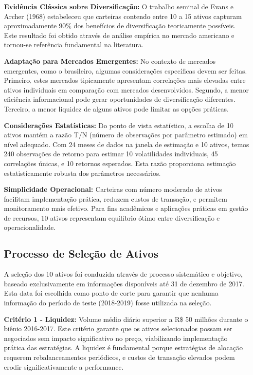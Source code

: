 \textbf{Evidência Clássica sobre Diversificação:} O trabalho seminal de Evans e Archer (1968) estabeleceu que carteiras contendo entre 10 a 15 ativos capturam aproximadamente 90\% dos benefícios de diversificação teoricamente possíveis. Este resultado foi obtido através de análise empírica no mercado americano e tornou-se referência fundamental na literatura.

\textbf{Adaptação para Mercados Emergentes:} No contexto de mercados emergentes, como o brasileiro, algumas considerações específicas devem ser feitas. Primeiro, estes mercados tipicamente apresentam correlações mais elevadas entre ativos individuais em comparação com mercados desenvolvidos. Segundo, a menor eficiência informacional pode gerar oportunidades de diversificação diferentes. Terceiro, a menor liquidez de alguns ativos pode limitar as opções práticas.

\textbf{Considerações Estatísticas:} Do ponto de vista estatístico, a escolha de 10 ativos mantém a razão T/N (número de observações por parâmetro estimado) em nível adequado. Com 24 meses de dados na janela de estimação e 10 ativos, temos 240 observações de retorno para estimar 10 volatilidades individuais, 45 correlações únicas, e 10 retornos esperados. Esta razão proporciona estimação estatisticamente robusta dos parâmetros necessários.

\textbf{Simplicidade Operacional:} Carteiras com número moderado de ativos facilitam implementação prática, reduzem custos de transação, e permitem monitoramento mais efetivo. Para fins acadêmicos e aplicações práticas em gestão de recursos, 10 ativos representam equilíbrio ótimo entre diversificação e operacionalidade.

\subsection{Processo de Seleção de Ativos}

A seleção dos 10 ativos foi conduzida através de processo sistemático e objetivo, baseado exclusivamente em informações disponíveis até 31 de dezembro de 2017. Esta data foi escolhida como ponto de corte para garantir que nenhuma informação do período de teste (2018-2019) fosse utilizada na seleção.

\textbf{Critério 1 - Liquidez:} Volume médio diário superior a R\$ 50 milhões durante o biênio 2016-2017. Este critério garante que os ativos selecionados possam ser negociados sem impacto significativo no preço, viabilizando implementação prática das estratégias. A liquidez é fundamental porque estratégias de alocação requerem rebalanceamentos periódicos, e custos de transação elevados podem erodir significativamente a performance.

